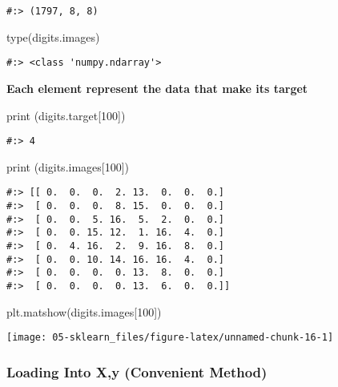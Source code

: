 \documentclass[
]{book}
\newenvironment{Shaded}{\begin{snugshade}}{\end{snugshade}}
\newcommand{\BuiltInTok}[1]{#1}
\newcommand{\DecValTok}[1]{\textcolor[rgb]{0.06,0.06,0.06}{#1}}
\newcommand{\NormalTok}[1]{#1}
\begin{document}
\begin{verbatim}
#:> (1797, 8, 8)
\end{verbatim}

\begin{Shaded}
\begin{Highlighting}[]
\BuiltInTok{type}\NormalTok{(digits.images)}
\end{Highlighting}
\end{Shaded}

\begin{verbatim}
#:> <class 'numpy.ndarray'>
\end{verbatim}

\textbf{Each element represent the data that make its target}

\begin{Shaded}
\begin{Highlighting}[]
\BuiltInTok{print}\NormalTok{ (digits.target[}\DecValTok{100}\NormalTok{])}
\end{Highlighting}
\end{Shaded}

\begin{verbatim}
#:> 4
\end{verbatim}

\begin{Shaded}
\begin{Highlighting}[]
\BuiltInTok{print}\NormalTok{ (digits.images[}\DecValTok{100}\NormalTok{])}
\end{Highlighting}
\end{Shaded}

\begin{verbatim}
#:> [[ 0.  0.  0.  2. 13.  0.  0.  0.]
#:>  [ 0.  0.  0.  8. 15.  0.  0.  0.]
#:>  [ 0.  0.  5. 16.  5.  2.  0.  0.]
#:>  [ 0.  0. 15. 12.  1. 16.  4.  0.]
#:>  [ 0.  4. 16.  2.  9. 16.  8.  0.]
#:>  [ 0.  0. 10. 14. 16. 16.  4.  0.]
#:>  [ 0.  0.  0.  0. 13.  8.  0.  0.]
#:>  [ 0.  0.  0.  0. 13.  6.  0.  0.]]
\end{verbatim}

\begin{Shaded}
\begin{Highlighting}[]
\NormalTok{plt.matshow(digits.images[}\DecValTok{100}\NormalTok{]) }
\end{Highlighting}
\end{Shaded}

\texttt{[image: 05-sklearn\_files/figure-latex/unnamed-chunk-16-1]}

\hypertarget{loading-into-xy-convenient-method}{%
\subsubsection{Loading Into X,y (Convenient Method)}\label{loading-into-xy-convenient-method}}
\end{document}
